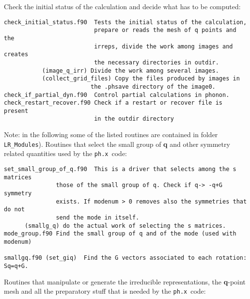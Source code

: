 \documentclass[12pt,a4paper]{article}
\def\phx{\texttt{ph.x}}
\begin{document}
Check the initial status of the calculation and decide what has to be
computed:

\begin{verbatim}
check_initial_status.f90  Tests the initial status of the calculation,
                          prepare or reads the mesh of q points and the
                          irreps, divide the work among images and creates
                          the necessary directories in outdir.    
           (image_q_irr) Divide the work among several images.
           (collect_grid_files) Copy the files produced by images in
                         the .phsave directory of the image0.
check_if_partial_dyn.f90  Control partial calculations in phonon. 
check_restart_recover.f90 Check if a restart or recover file is present
                          in the outdir directory       
\end{verbatim}

Note: in the following some of the listed routines are contained in folder
\texttt{LR\_Modules}).
Routines that select the small group of {\bf q} and other symmetry related 
quantities used by the \phx\ code:

\begin{verbatim}
set_small_group_of_q.f90  This is a driver that selects among the s matrices 
               those of the small group of q. Check if q-> -q+G symmetry 
               exists. If modenum > 0 removes also the symmetries that do not
               send the mode in itself.
      (smallg_q) do the actual work of selecting the s matrices.
mode_group.f90 Find the small group of q and of the mode (used with modenum)

smallgq.f90 (set_giq)  Find the G vectors associated to each rotation: Sq=q+G.
\end{verbatim}


Routines that manipulate or generate the irreducible representations, 
the {\bf q}-point mesh and all the preparatory stuff that is needed by the
\phx\ code:
\end{document}
